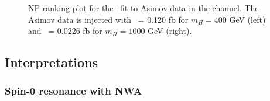 \begin{figure}[!ht]
\begin{center}
\caption{NP ranking plot for the \xsVBF\ fit to Asimov data in the \llll channel.
The Asimov data is injected with \xsVBF\ = 0.120 fb for $m_H = 400$ GeV (left) and \xsVBF\ = 0.0226 fb for $m_H = 1000$ GeV (right).
}
\label{fig:rank_cb_NWA_VBF}
\end{center}
\end{figure}


\subsection{Interpretations}

\subsubsection{Spin-0 resonance with NWA}

